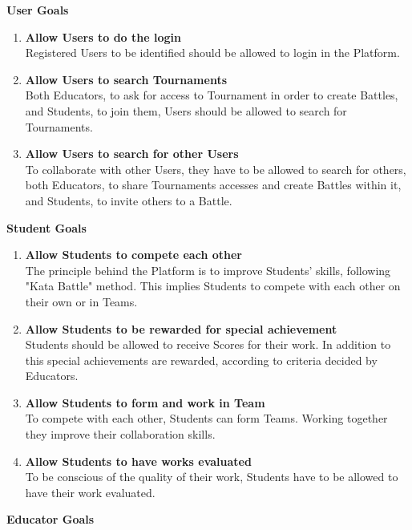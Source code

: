 \textbf{User Goals}
    \begin{enumerate}[label=$\bullet$ \textbf{GU\arabic*:}]
        \item \textbf{Allow Users to do the login}\\Registered Users to be identified should be allowed to login in the Platform.
        \item \textbf{Allow Users to search Tournaments}\\Both Educators, to ask for access to Tournament in order to create Battles, and Students, to join them, Users should be allowed to search for Tournaments.
        \item \textbf{Allow Users to search for other Users}\\To collaborate with other Users, they have to be allowed to search for others, both Educators, to share Tournaments accesses and create Battles within it, and Students, to invite others to a Battle.
    \end{enumerate}
\textbf{Student Goals}
\begin{enumerate}[label=$\bullet$ \textbf{GS\arabic*:}]
    \item \textbf{Allow Students to compete each other}\\The principle behind the Platform is to improve Students' skills, following "Kata Battle" method. This implies Students to compete with each other on their own or in Teams.
    \item \textbf{Allow Students to be rewarded for special achievement}\\Students should be allowed to receive Scores for their work. In addition to this special achievements are rewarded, according to criteria decided by Educators.
    \item \textbf{Allow Students to form and work in Team}\\To compete with each other, Students can form Teams. Working together they improve their collaboration skills.
    \item \textbf{Allow Students to have works evaluated}\\To be conscious of the quality of their work, Students have to be allowed to have their work evaluated.
\end{enumerate}
\textbf{Educator Goals}
